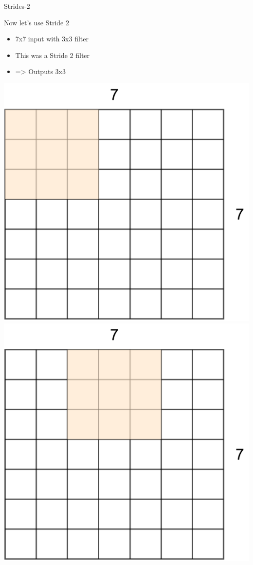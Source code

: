 \documentclass[default, aspectratio=169]{beamer}
\begin{document}
	\begin{frame}{Strides-2}
		\vspace{0.5cm}
		
		\normalsize Now let's use Stride 2
		\begin{itemize}
			\item 7x7 input with 3x3 filter
			\item This was a Stride 2 filter
			\item=> Outputs 3x3
		\end{itemize}
		
		\centering
		\includegraphics[keepaspectratio, scale=0.2]{pic/Stride6.png}
		\hspace{0.2cm}
		\includegraphics[keepaspectratio, scale=0.2]{pic/Stride7.png}

\end{frame}
\end{document}
